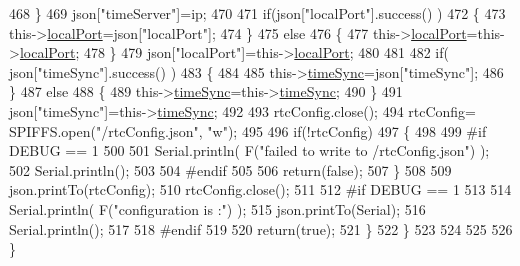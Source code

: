\begin{DoxyCode}
468             \}
469             json[\textcolor{stringliteral}{"timeServer"}]=ip;
470             
471             \textcolor{keywordflow}{if}(json[\textcolor{stringliteral}{"localPort"}].success() )
472             \{                       
473                 this->\hyperlink{class_cool_time_a2f777da44d7ba678be8185299e9b49d1}{localPort}=json[\textcolor{stringliteral}{"localPort"}];
474             \}
475             \textcolor{keywordflow}{else}
476             \{
477                 this->\hyperlink{class_cool_time_a2f777da44d7ba678be8185299e9b49d1}{localPort}=this->\hyperlink{class_cool_time_a2f777da44d7ba678be8185299e9b49d1}{localPort};
478             \}
479             json[\textcolor{stringliteral}{"localPort"}]=this->\hyperlink{class_cool_time_a2f777da44d7ba678be8185299e9b49d1}{localPort};
480 
481 
482             \textcolor{keywordflow}{if}( json[\textcolor{stringliteral}{"timeSync"}].success() )
483             \{
484 
485                 this->\hyperlink{class_cool_time_a9d032e76c3470a15b3bbbc52af6463f7}{timeSync}=json[\textcolor{stringliteral}{"timeSync"}];
486             \}
487             \textcolor{keywordflow}{else}
488             \{
489                 this->\hyperlink{class_cool_time_a9d032e76c3470a15b3bbbc52af6463f7}{timeSync}=this->\hyperlink{class_cool_time_a9d032e76c3470a15b3bbbc52af6463f7}{timeSync};
490             \}
491             json[\textcolor{stringliteral}{"timeSync"}]=this->\hyperlink{class_cool_time_a9d032e76c3470a15b3bbbc52af6463f7}{timeSync};
492 
493             rtcConfig.close();
494             rtcConfig= SPIFFS.open(\textcolor{stringliteral}{"/rtcConfig.json"}, \textcolor{stringliteral}{"w"});
495             
496             \textcolor{keywordflow}{if}(!rtcConfig)
497             \{
498             
499 \textcolor{preprocessor}{            #if DEBUG == 1}
500 
501                 Serial.println( F(\textcolor{stringliteral}{"failed to write to /rtcConfig.json"}) );
502                 Serial.println();
503             
504 \textcolor{preprocessor}{            #endif}
505 
506                 \textcolor{keywordflow}{return}(\textcolor{keyword}{false});
507             \}
508             
509             json.printTo(rtcConfig);
510             rtcConfig.close();
511 
512 \textcolor{preprocessor}{        #if DEBUG == 1 }
513 
514             Serial.println( F(\textcolor{stringliteral}{"configuration is :"}) );
515             json.printTo(Serial);
516             Serial.println();
517         
518 \textcolor{preprocessor}{        #endif}
519         
520             \textcolor{keywordflow}{return}(\textcolor{keyword}{true}); 
521         \}
522     \}   
523 
524 
525 
526 \}
\end{DoxyCode}
